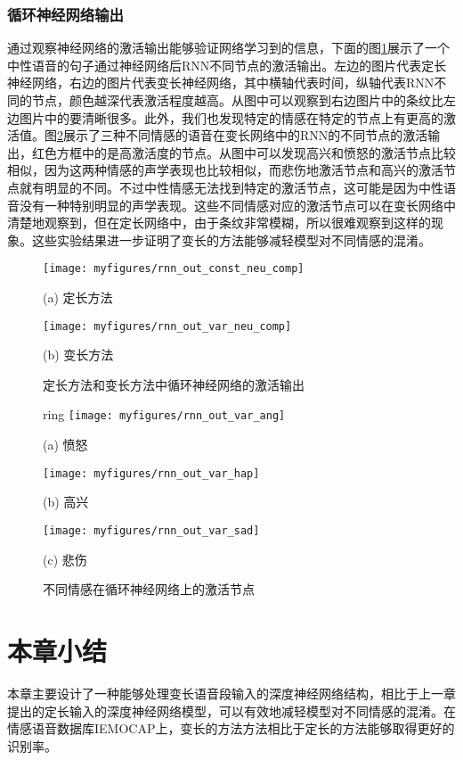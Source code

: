 \subsubsection{循环神经网络输出}
\label{sec:var_len_experiement_rnn}

通过观察神经网络的激活输出能够验证网络学习到的信息，下面的图\ref{fig:rnn_out_comp}展示了一个中性语音的句子通过神经网络后RNN不同节点的激活输出。左边的图片代表定长神经网络，右边的图片代表变长神经网络，其中横轴代表时间，纵轴代表RNN不同的节点，颜色越深代表激活程度越高。从图中可以观察到右边图片中的条纹比左边图片中的要清晰很多。此外，我们也发现特定的情感在特定的节点上有更高的激活值。图\ref{fig:rnn_out_emotions}展示了三种不同情感的语音在变长网络中的RNN的不同节点的激活输出，红色方框中的是高激活度的节点。从图中可以发现高兴和愤怒的激活节点比较相似，因为这两种情感的声学表现也比较相似，而悲伤地激活节点和高兴的激活节点就有明显的不同。不过中性情感无法找到特定的激活节点，这可能是因为中性语音没有一种特别明显的声学表现。这些不同情感对应的激活节点可以在变长网络中清楚地观察到，但在定长网络中，由于条纹非常模糊，所以很难观察到这样的现象。这些实验结果进一步证明了变长的方法能够减轻模型对不同情感的混淆。

\begin{figure}[htb]
\begin{minipage}{0.48\textwidth}
    \centering
    \texttt{[image: myfigures/rnn\_out\_const\_neu\_comp]}
    \centerline{(a) 定长方法}\medskip
\end{minipage}\hfill
\begin{minipage}{0.48\textwidth}
    \centering
    \texttt{[image: myfigures/rnn\_out\_var\_neu\_comp]}
    \centerline{(b) 变长方法}\medskip
\end{minipage}
\caption{定长方法和变长方法中循环神经网络的激活输出}
\label{fig:rnn_out_comp}
\end{figure}

\begin{figure}[htb]
\begin{minipage}{0.3\textwidth}
    \cente  ring
    \texttt{[image: myfigures/rnn\_out\_var\_ang]}
    \centerline{(a) 愤怒}\medskip
\end{minipage}\hfill
\begin{minipage}{0.3\textwidth}
    \centering
    \texttt{[image: myfigures/rnn\_out\_var\_hap]}
    \centerline{(b) 高兴}\medskip
\end{minipage}
\begin{minipage}{0.3\textwidth}
    \centering
    \texttt{[image: myfigures/rnn\_out\_var\_sad]}
    \centerline{(c) 悲伤}\medskip
\end{minipage}
\caption{不同情感在循环神经网络上的激活节点}
\label{fig:rnn_out_emotions}
\end{figure}

\section{本章小结}
\label{sec:var_len_summary}

本章主要设计了一种能够处理变长语音段输入的深度神经网络结构，相比于上一章提出的定长输入的深度神经网络模型，可以有效地减轻模型对不同情感的混淆。在情感语音数据库IEMOCAP上，变长的方法方法相比于定长的方法能够取得更好的识别率。